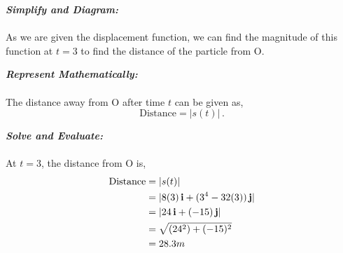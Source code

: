 \begin{subquestions}
\begin{subsubquestions}

\subsubquestion

\textbf{\textit{Simplify and Diagram:}} \\ \\
As we are given the displacement function, we can find the magnitude of this function at $t=3$ to find the distance of the particle from O.




\textbf{\textit{Represent Mathematically:}} \\ \\
The distance away from O after time $t$ can be given as,
\begin{equation}
	\text{Distance} = |s(t)| \,.
\end{equation}




\textbf{\textit{Solve and Evaluate:}} \\ \\
At $t=3$, the distance from O is,
\begin{align}
	\text{Distance} & = |s(t)| \nonumber \\
	                & = |8(3)\,\mathbf{i} + (3^4-32(3))\,\mathbf{j}| \nonumber \\
	                & = |24\,\mathbf{i} + (-15)\,\mathbf{j}| \nonumber \\
	                & = \sqrt{(24^2)+(-15)^2} \nonumber \\
	                & = 28.3m
\end{align}




 
	
	
	
	
	
	
\end{subsubquestions}












	

	
	
	
\end{subquestions}









